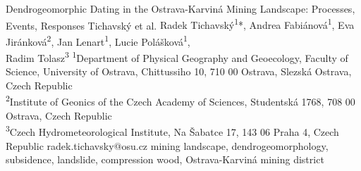 

\abstract
{Dendrogeomorphic Dating in the Ostrava-Karviná Mining Landscape: Processes, Events, Responses} %
{Tichavský et al.} %
{Radek Tichavský\textsuperscript{1}*, Andrea Fabiánová\textsuperscript{1}, Eva Jiránková\textsuperscript{2}, Jan Lenart\textsuperscript{1}, Lucie Polášková\textsuperscript{1}, \\Radim Tolasz\textsuperscript{3}
} %
{\TLtag} %
{
\textsuperscript{1}Department of Physical Geography and Geoecology, Faculty of Science, University of Ostrava, Chittussiho 10, 710 00 Ostrava, Slezská Ostrava, Czech Republic\\
\textsuperscript{2}Institute of Geonics of the Czech Academy of Sciences, Studentská 1768, 708 00 Ostrava, Czech Republic\\
\textsuperscript{3}Czech Hydrometeorological Institute, Na Šabatce 17, 143 06 Praha 4, Czech Republic
} %
{radek.tichavsky@osu.cz}  %
{mining landscape, dendrogeomorphology, subsidence, landslide, compression wood, Ostrava-Karviná mining district}%

